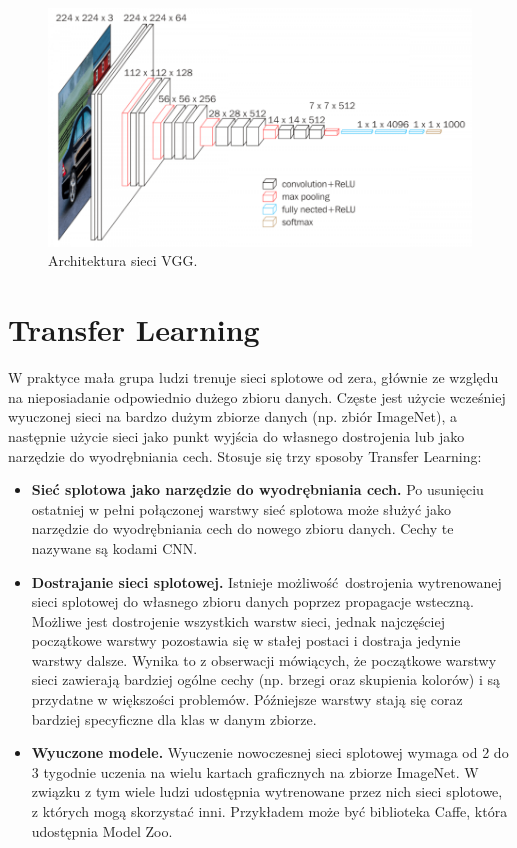 \documentclass[a4paper,11pt, notitlepage, twosides, openany ]{report}
\begin{document}
	\begin{figure}[h]
		\centering
		\includegraphics[width=1\textwidth]{vgg16.png}
		\caption{Architektura sieci VGG.}
		\label{vgg}
	\end{figure}

	\section{Transfer Learning}
	W praktyce mała grupa ludzi trenuje sieci splotowe od zera, głównie ze względu na nieposiadanie odpowiednio dużego zbioru danych. Częste jest użycie wcześniej wyuczonej sieci na bardzo dużym zbiorze danych (np. zbiór ImageNet), a następnie użycie sieci jako punkt wyjścia do własnego dostrojenia lub jako narzędzie do wyodrębniania cech. Stosuje się trzy sposoby Transfer Learning:

	\begin{itemize}
		\item \textbf{Sieć splotowa jako narzędzie do wyodrębniania cech.} Po usunięciu ostatniej w pełni połączonej warstwy sieć splotowa może służyć jako narzędzie do wyodrębniania cech do nowego zbioru danych. Cechy te nazywane są kodami CNN.
		\item \textbf{Dostrajanie sieci splotowej.} Istnieje możliwość dostrojenia wytrenowanej sieci splotowej do własnego zbioru danych poprzez propagacje wsteczną. Możliwe jest dostrojenie wszystkich warstw sieci, jednak najczęściej początkowe warstwy pozostawia się w stałej postaci i dostraja jedynie warstwy dalsze. Wynika to z obserwacji mówiących, że początkowe warstwy sieci zawierają bardziej ogólne cechy (np. brzegi oraz skupienia kolorów) i są przydatne w większości problemów. Późniejsze warstwy stają się coraz bardziej specyficzne dla klas w danym zbiorze.
		\item \textbf{Wyuczone modele.} Wyuczenie nowoczesnej sieci splotowej wymaga od 2 do 3 tygodnie uczenia na wielu kartach graficznych na zbiorze ImageNet. W związku z tym wiele ludzi udostępnia wytrenowane przez nich sieci splotowe, z których mogą skorzystać inni. Przykładem może być biblioteka Caffe, która udostępnia Model Zoo.
	\end{itemize}
\end{document}
